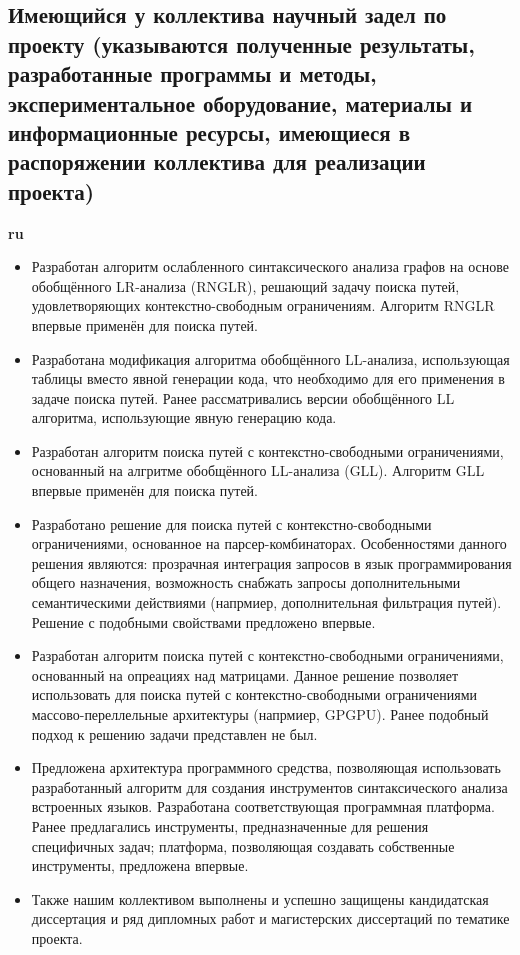 \documentclass[12pt]{article}  %
\theoremstyle{remark}
\begin{document}
\subsection{Имеющийся у коллектива научный задел по проекту (указываются полученные результаты, разработанные программы и методы, экспериментальное оборудование, материалы и информационные ресурсы, имеющиеся в распоряжении коллектива для реализации проекта)}

\textbf{ru}\\
\begin{itemize}
  \item Разработан алгоритм ослабленного синтаксического анализа графов на основе обобщённого LR-анализа (RNGLR), решающий задачу поиска путей, удовлетворяющих контекстно-свободным ограничениям. Алгоритм RNGLR впервые применён для поиска путей.
  \item  Разработана модификация алгоритма обобщённого LL-анализа, использующая таблицы вместо явной генерации кода, что необходимо для его применения в задаче поиска путей. Ранее рассматривались версии обобщённого LL алгоритма, использующие явную генерацию кода.
  \item Разработан алгоритм поиска путей с контекстно-свободными ограничениями, основанный на алгритме обобщённого LL-анализа (GLL). Алгоритм GLL впервые применён для поиска путей.
  \item Разработано решение для поиска путей с контекстно-свободными ограничениями, основанное на парсер-комбинаторах. Особенностями данного решения являются: прозрачная интеграция запросов в язык программирования общего назначения, возможность снабжать запросы дополнительными семантическими действиями (напрмиер, дополнительная фильтрация путей). Решение с подобными свойствами предложено впервые.
  \item Разработан алгоритм поиска путей с контекстно-свободными ограничениями, основанный на опреациях над матрицами. Данное решение позволяет использовать для поиска путей с контекстно-свободными ограничениями массово-переллельные архитектуры (напрмиер, GPGPU). Ранее подобный подход к решению задачи представлен не был.
  \item  Предложена архитектура программного средства, позволяющая использовать разработанный алгоритм для создания инструментов синтаксического анализа встроенных языков. Разработана соответствующая программная платформа. Ранее предлагались инструменты, предназначенные для решения специфичных задач; платформа, позволяющая создавать собственные инструменты, предложена впервые.
  \item  Также нашим коллективом выполнены и успешно защищены кандидатская диссертация и ряд дипломных работ и магистерских диссертаций по тематике проекта.
\end{itemize}
\end{document}
